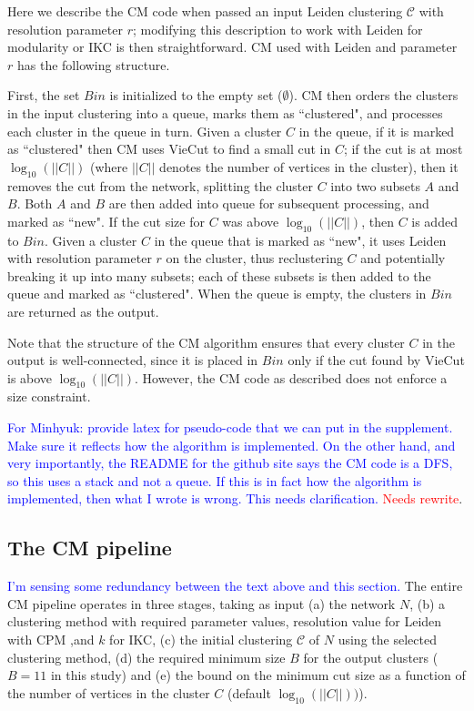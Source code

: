 \documentclass[12pt, oneside]{article}   	%
\begin{document}
Here we describe the CM code when passed an input  Leiden clustering $\mathcal{C}$  with resolution parameter $r$; modifying this description to work with 
Leiden for modularity or IKC is then straightforward.
CM used with Leiden and parameter $r$ has the following structure.


First, the set $Bin$ is initialized to the empty set  ($\emptyset$).
CM  then orders the clusters in the input clustering into a queue,  marks them as ``clustered", and processes each cluster in the queue in turn.
Given a cluster $C$ in the queue, if it is marked as ``clustered" then CM uses VieCut to find a small cut in $C$;  if the cut is at most $\log_{10}(||C||)$ (where $||C||$ denotes the number of 
vertices in the cluster), then it removes the cut from the network, splitting the cluster $C$ into two  subsets $A$ and $B$.
Both $A$ and $B$ are then added into  queue for subsequent processing, and marked as ``new". 
If the cut size for $C$ was above $\log_{10}(||C||)$, then $C$ is added to $Bin$.
Given a cluster $C$ in the queue that is marked as ``new", it uses Leiden with resolution parameter $r$ on the cluster, thus reclustering $C$
and potentially breaking it up into many subsets; each of these subsets is then added to the queue and marked as ``clustered".
When the queue is empty, the clusters in $Bin$ are returned as the output.

Note that the structure of the CM algorithm ensures that every cluster $C$ in the output is well-connected, since it is 
placed in $Bin$ only if the cut found by VieCut is above $\log_{10}(||C||)$.
However, the CM code as described does not enforce a size constraint.

\textcolor{blue}{For Minhyuk: provide latex for pseudo-code that we can put in the supplement. Make sure it reflects how the algorithm is implemented. On the other hand, and very importantly, the README for the github site says the CM code is a DFS, so this uses a stack and not a queue.  If this is in fact how the algorithm is implemented, then what I wrote is wrong. This needs clarification.} \textcolor{red}{Needs rewrite}.

\subsection{The CM pipeline} \textcolor{blue}{I'm sensing some redundancy between the text above and this section.}
The entire CM pipeline operates in three stages, taking as input (a) the network $N$,  (b) a clustering method with required parameter values,  resolution value for Leiden with CPM ,and $k$ for IKC,
(c)  the initial clustering $\mathcal{C}$ of $N$ using the selected clustering method, 
(d) the required minimum size $B$ for the output clusters ($B=11$ in this study)
and (e) the bound on the minimum cut size as a function of the number of vertices in the cluster $C$
(default $\log_{10}(||C||))$).
\end{document}
